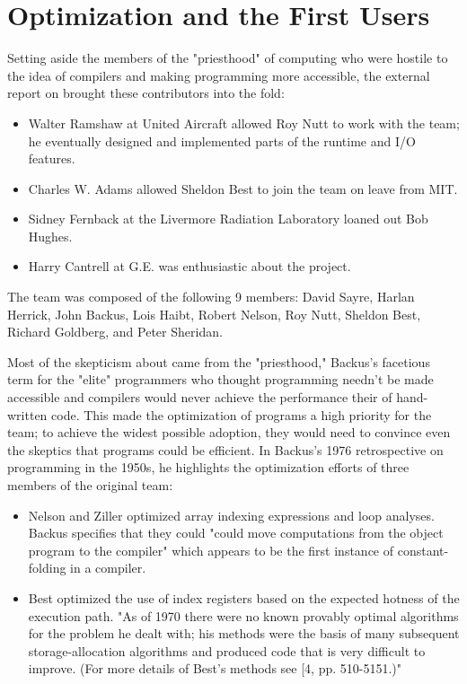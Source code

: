 \section{\FTN{} Optimization and the First Users}

Setting aside the members of the "priesthood" of computing who were hostile to
the idea of compilers and making programming more accessible, the external
report on \FTN{} brought these contributors into the fold:
\begin{itemize}
    \item Walter Ramshaw at United Aircraft allowed Roy Nutt to work with the team; he
          eventually designed and implemented parts of the runtime and I/O features.
    \item Charles W. Adams allowed Sheldon Best to join the team on leave from MIT.
    \item Sidney Fernback at the Livermore Radiation Laboratory loaned out Bob Hughes.
    \item Harry Cantrell at G.E. was enthusiastic about the project.
\end{itemize}

The team was composed of the following 9 members: David Sayre, Harlan Herrick,
John Backus, Lois Haibt, Robert Nelson, Roy Nutt, Sheldon Best, Richard
Goldberg, and Peter Sheridan.

Most of the skepticism about \FTN{} came from the "priesthood," Backus's
facetious term for the "elite" programmers who thought programming needn't be
made accessible and compilers would never achieve the performance their of
hand-written code. This made the optimization of \FTN{} programs a high
priority for the team; to achieve the widest possible adoption, they would need
to convince even the skeptics that \FTN{} programs could be efficient. In
Backus's 1976 retrospective on programming in the
1950s\cite{Backus_1980_Programming_in_America_in_1950s}, he highlights the
optimization efforts of three members of the original team:

\begin{itemize}
    \item Nelson and Ziller optimized array indexing expressions and loop analyses.
          Backus specifies that they could "could move computations from the object
          program to the compiler" which appears to be the first instance of
          constant-folding in a compiler.
    \item Best optimized the use of index registers based on the expected hotness of the
          execution path. "As of 1970 there were no known provably optimal algorithms for
          the problem he dealt with; his methods were the basis of many subsequent
          storage-allocation algorithms and produced code that is very difficult to
          improve. (For more details of Best's methods see [4, pp. 510-5151.)"
\end{itemize}

